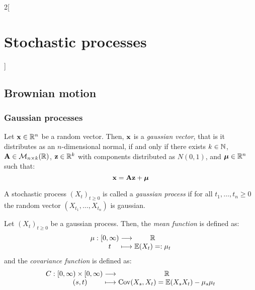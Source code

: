 \documentclass[../../../main_math.tex]{subfiles}
\begin{document}
\begin{multicols}{2}[\section{Stochastic processes}]
  \subsection{Brownian motion}
  \subsubsection{Gaussian processes}
  \begin{proposition}\label{SP:gaussian_vector}
    Let $\boldsymbol{\mathrm{x}}\in \mathbb{R}^n$ be a random vector. Then, $\boldsymbol{\mathrm{x}}$ is a \emph{gaussian vector}, that is it distributes as an $n$-dimensional normal, if and only if there exists $k\in\mathbb{N}$, $\boldsymbol{\mathrm{A}}\in\mathcal{M}_{n\times k}(\mathbb{R})$, $\boldsymbol{\mathrm{z}}\in\mathbb{R}^k$ with \iid components distributed as $N(0,1)$, and $\boldsymbol{\mathrm{\mu}}\in\mathbb{R}^n$ such that: $$\boldsymbol{\mathrm{x}}=\boldsymbol{\mathrm{A}}\boldsymbol{\mathrm{z}}+\boldsymbol{\mathrm{\mu}}$$
  \end{proposition}
  \begin{definition}
    A stochastic process ${(X_t)}_{t\geq 0}$ is called a \emph{gaussian process} if for all $t_1,\ldots,t_n\geq 0$ the random vector $(X_{t_1},\ldots,X_{t_n})$ is gaussian.
  \end{definition}
  \begin{definition}
    Let ${(X_t)}_{t\geq 0}$ be a gaussian process.
    Then, the \emph{mean function} is defined as:
    $$
      \function{\mu}{[0,\infty)}{\RR}{t}{\Exp(X_t)=:\mu_t}
    $$
    and the \emph{covariance function} is defined as:
    $$
      \function{C}{[0,\infty)\times[0,\infty)}{\RR}{(s,t)}{\cov(X_s,X_t)=\Exp(X_sX_t)-\mu_s\mu_t}
    $$
  \end{definition}

\end{multicols}
\end{document}
